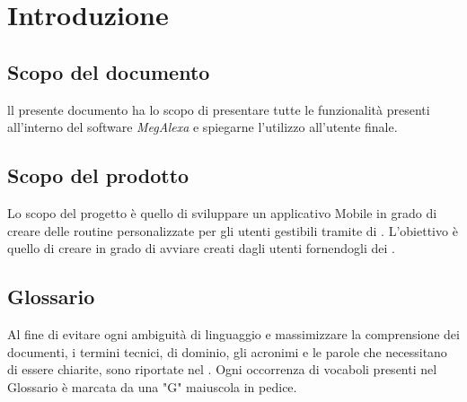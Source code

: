 \chapter{Introduzione}
\label{Introduzione}

\section{Scopo del documento}
ll presente documento ha lo scopo di presentare tutte le funzionalità presenti all'interno del software \textit{MegAlexa} e spiegarne l'utilizzo all'utente finale.

\section{Scopo del prodotto}
Lo scopo del progetto è  quello di sviluppare un applicativo Mobile in grado di creare delle routine personalizzate per gli utenti gestibili tramite  di . L’obiettivo è quello di creare  in grado di avviare  creati dagli utenti fornendogli dei .


\section{Glossario}
Al fine di evitare ogni ambiguità di linguaggio e massimizzare la comprensione dei documenti, i termini tecnici, di dominio, gli acronimi e le parole che necessitano di essere chiarite, sono riportate nel \glossariodocumento.
Ogni occorrenza di vocaboli presenti nel Glossario è marcata da una "G" maiuscola in pedice.
